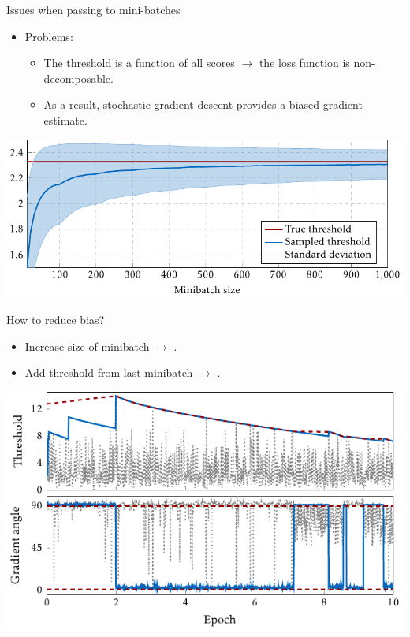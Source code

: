 \documentclass[10pt, aspectratio=169]{beamer}
\begin{document}
\begin{frame}{Issues when passing to mini-batches}
  \begin{itemize}
    \item Problems:
    \begin{itemize}
      \item The threshold is a function of all scores $\rightarrow$ the loss function is non-decomposable.
      \item As a result, stochastic gradient descent provides a biased gradient estimate.
    \end{itemize}
  \end{itemize}
  \begin{center}
    \includegraphics[width=\linewidth, height=0.6\textheight, keepaspectratio]{
      ../images/deep_threshold_bias.pdf
    }
  \end{center}
\end{frame}

\begin{frame}{How to reduce bias?}
  \begin{itemize}
    \item Increase size of minibatch $\rightarrow$ \PatMatNP.
    \item Add threshold from last minibatch $\rightarrow$ \DeepTopPush.
  \end{itemize}
  \begin{center}
    \includegraphics[width=\linewidth, height=0.75\textheight, keepaspectratio]{
      ../images/deep_thresholds.pdf
    }
  \end{center}
\end{frame}
\end{document}
